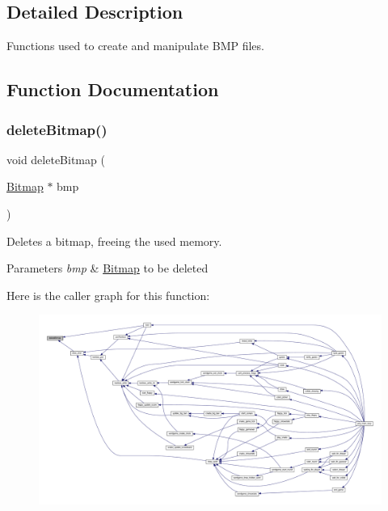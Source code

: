\subsection{Detailed Description}
Functions used to create and manipulate B\+MP files. 

\subsection{Function Documentation}
\mbox{\label{group__bitmap_ga08c1d4f4fff81df260d979ea8fc1aa61}} 
\subsubsection{\texorpdfstring{delete\+Bitmap()}{deleteBitmap()}}
{\footnotesize\ttfamily void delete\+Bitmap (\begin{DoxyParamCaption}\item[{\mbox{\hyperlink{struct_bitmap}{Bitmap}} $\ast$}]{bmp }\end{DoxyParamCaption})}



Deletes a bitmap, freeing the used memory. 


\begin{DoxyParams}{Parameters}
{\em bmp} & \mbox{\hyperlink{struct_bitmap}{Bitmap}} to be deleted \\
\hline
\end{DoxyParams}
Here is the caller graph for this function\+:\nopagebreak
\begin{figure}[H]
\begin{center}
\leavevmode
\includegraphics[width=350pt]{group__bitmap_ga08c1d4f4fff81df260d979ea8fc1aa61_icgraph}
\end{center}
\end{figure}
\mbox{\label{group__bitmap_ga37e42f0583efd18e7efa5a036798539e}} 
